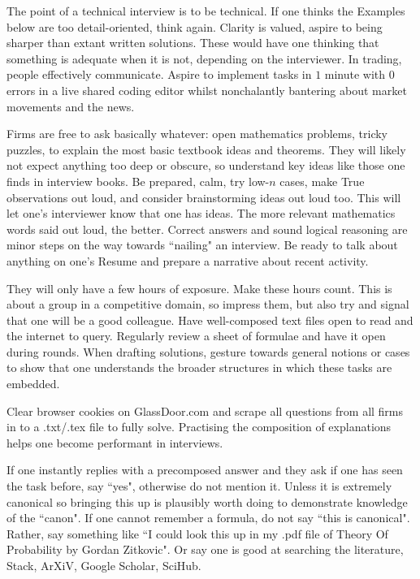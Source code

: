 The point of a technical interview is to be technical. If one thinks the Examples below are too detail-oriented, think again. Clarity is valued, aspire to being sharper than extant written solutions. These would have one thinking that something is adequate when it is not, depending on the interviewer. In trading, people effectively communicate. Aspire to implement tasks in $1$ minute with $0$ errors in a live shared coding editor whilst nonchalantly bantering about market movements and the news.

Firms are free to ask basically whatever: open mathematics problems, tricky puzzles, to explain the most basic textbook ideas and theorems. They will likely not expect anything too deep or obscure, so understand key ideas like those one finds in interview books. Be prepared, calm, try low-$n$ cases, make True observations out loud, and consider brainstorming ideas out loud too. This will let one's interviewer know that one has ideas. The more relevant mathematics words said out loud, the better. Correct answers and sound logical reasoning are minor steps on the way towards ``nailing" an interview. Be ready to talk about anything on one's Resume and prepare a narrative about recent activity.

They will only have a few hours of exposure. Make these hours count. This is about a group in a competitive domain, so impress them, but also try and signal that one will be a good colleague. Have well-composed text files open to read and the internet to query. Regularly review a sheet of formulae and have it open during rounds. When drafting solutions, gesture towards general notions or cases to show that one understands the broader structures in which these tasks are embedded.

Clear browser cookies on GlassDoor.com and scrape all questions from all firms in to a .txt/.tex file to fully solve. Practising the composition of explanations helps one become performant in interviews.

If one instantly replies with a precomposed answer and they ask if one has seen the task before, say ``yes", otherwise do not mention it. Unless it is extremely canonical so bringing this up is plausibly worth doing to demonstrate knowledge of the ``canon". If one cannot remember a formula, do not say ``this is canonical". Rather, say something like ``I could look this up in my .pdf file of Theory Of Probability by Gordan Zitkovic". Or say one is good at searching the literature, Stack, ArXiV, Google Scholar, SciHub.

